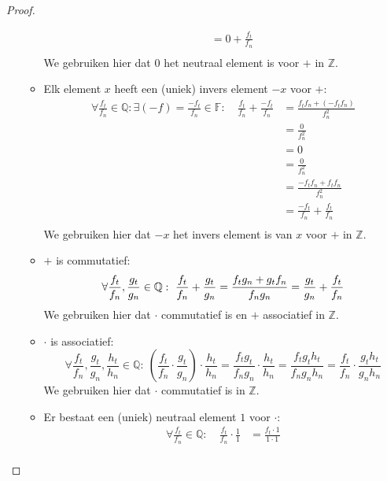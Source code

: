 \documentclass[main.tex]{subfiles}
\begin{document}
\begin{pr}
\begin{proof}
\begin{itemize}
\begin{itemize}
\[\begin{array}{rrl}
          &&= 0 +  \frac{f_{t}}{f_{n}}\\
        \end{array}
        \]
        We gebruiken hier dat $0$ het neutraal element is voor $+$ in $\mathbb{Z}$.
      \item Elk element $x$ heeft een (uniek) invers element $-x$ voor $+$:
        \[
        \begin{array}{rrl}
          \forall \frac{f_{t}}{f_{n}}\in \mathbb{Q}: \exists (-f) = \frac{-f_{t}}{f_{n}} \in \mathbb{F}: \ 
          &\frac{f_{t}}{f_{n}} + \frac{-f_{t}}{f_{n}}
          &= \frac{f_{t}f_{n} + (-f_{t}f_{n})}{f_{n}^{2}}\\
          &&= \frac{0}{f_{n}^{2}}\\
          &&= 0 \\
          &&= \frac{0}{f_{n}^{2}}\\
          &&= \frac{-f_{t}f_{n} + f_{t}f_{n}}{f_{n}^{2}}\\
          &&= \frac{-f_{t}}{f_{n}} + \frac{f_{t}}{f_{n}}\\
        \end{array}
        \]
        We gebruiken hier dat $-x$ het invers element is van $x$ voor $+$ in $\mathbb{Z}$. 
      \item $+$ is commutatief:
        \[
        \forall \frac{f_{t}}{f_{n}},\frac{g_{t}}{g_{n}} \in \mathbb{Q}:\
        \frac{f_{t}}{f_{n}} + \frac{g_{t}}{g_{n}}
        = \frac{f_{t}g_{n}+g_{t}f_{n}}{f_{n}g_{n}}\\ 
        = \frac{g_{t}}{g_{n}} + \frac{f_{t}}{f_{n}}\\
        \]
        We gebruiken hier dat $\cdot$ commutatief is en $+$ associatief in $\mathbb{Z}$.
      \item $\cdot$ is associatief:
        \[
        \forall \frac{f_{t}}{f_{n}},\frac{g_{t}}{g_{n}},\frac{h_{t}}{h_{n}} \in \mathbb{Q}:\
        \left(\frac{f_{t}}{f_{n}} \cdot \frac{g_{t}}{g_{n}}\right) \cdot \frac{h_{t}}{h_{n}}
        =\frac{f_{t}g_{t}}{f_{n}g_{n}} \cdot \frac{h_{t}}{h_{n}}
        =\frac{f_{t}g_{t}h_{t}}{f_{n}g_{n}h_{n}}
        =\frac{f_{t}}{f_{n}} \cdot \frac{g_{t}h_{t}}{g_{n}h_{n}}
        \]
        We gebruiken hier dat $\cdot$ commutatief is in $\mathbb{Z}$.
      \item Er bestaat een (uniek) neutraal element $1$ voor $\cdot$:
        \[
        \begin{array}{rrl}
          \forall \frac{f_{t}}{f_{n}}\in \mathbb{Q}:\
          &\frac{f_{t}}{f_{n}} \cdot \frac{1}{1}
          &= \frac{f_{t}\cdot 1}{1 \cdot 1}\\

\end{array}\]
\end{itemize}
\end{itemize}
\end{proof}
\end{pr}
\end{document}
